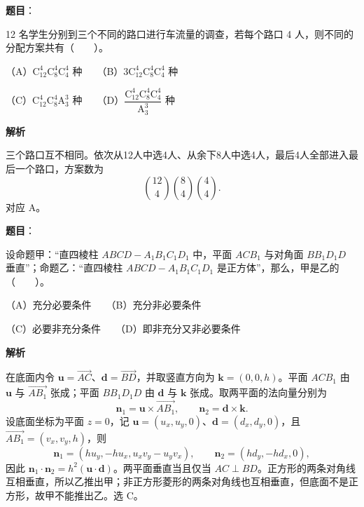 \begin{answer}

\textbf{题目}：

12 名学生分别到三个不同的路口进行车流量的调查，若每个路口 4 人，则不同的分配方案共有\mbox{（　　）}。

（A）\(\mathrm C_{12}^{4}\mathrm C_8^{4}\mathrm C_4^{4}\) 种　　（B）\(3\mathrm C_{12}^{4}\mathrm C_8^{4}\mathrm C_4^{4}\) 种

（C）\(\mathrm C_{12}^{4}\mathrm C_8^{4}\mathrm A_3^{3}\) 种　　（D）\(\dfrac{\mathrm C_{12}^{4}\mathrm C_8^{4}\mathrm C_4^{4}}{\mathrm A_3^{3}}\) 种

\textbf{解析}

三个路口互不相同。依次从12人中选4人、从余下8人中选4人，最后4人全部进入最后一个路口，方案数为
\nopagebreak[4]
\[
\binom{12}{4}\binom84\binom44.
\]
对应 A。


\end{answer}
\begin{answer}

\textbf{题目}：

设命题甲：“直四棱柱 \(ABCD-A_1B_1C_1D_1\) 中，平面 \(ACB_1\) 与对角面 \(BB_1D_1D\) 垂直”；命题乙：“直四棱柱 \(ABCD-A_1B_1C_1D_1\) 是正方体”，那么，甲是乙的\mbox{（　　）}。

（A）充分必要条件　　（B）充分非必要条件

（C）必要非充分条件　　（D）即非充分又非必要条件

\textbf{解析}

在底面内令 \(\mathbf u=\overrightarrow{AC}\)、\(\mathbf d=\overrightarrow{BD}\)，并取竖直方向为 \(\mathbf k=(0,0,h)\)。平面 \(ACB_1\) 由 \(\mathbf u\) 与 \(\overrightarrow{AB_1}\) 张成；平面 \(BB_1D_1D\) 由 \(\mathbf d\) 与 \(\mathbf k\) 张成。取两平面的法向量分别为
\nopagebreak[4]
\[
\mathbf n_1=\mathbf u\times\overrightarrow{AB_1},\qquad
\mathbf n_2=\mathbf d\times\mathbf k.
\]
设底面坐标为平面 \(z=0\)，记 \(\mathbf u=(u_x,u_y,0)\)、\(\mathbf d=(d_x,d_y,0)\)，且 \(\overrightarrow{AB_1}=(v_x,v_y,h)\)，则
\nopagebreak[4]
\[
\mathbf n_1=(hu_y,-hu_x,u_xv_y-u_yv_x),\qquad
\mathbf n_2=(hd_y,-hd_x,0),
\]
因此 \(\mathbf n_1\cdot\mathbf n_2=h^2(\mathbf u\cdot\mathbf d)\)。两平面垂直当且仅当 \(AC\perp BD\)。正方形的两条对角线互相垂直，所以乙推出甲；非正方形菱形的两条对角线也互相垂直，但底面不是正方形，故甲不能推出乙。选 C。


\end{answer}
